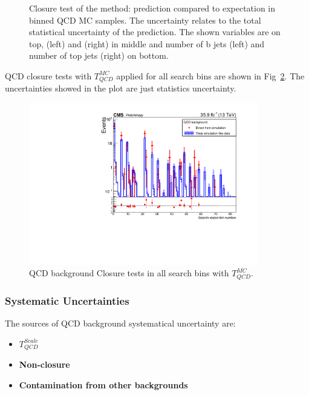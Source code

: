 \begin{figure}[hp]
\begin{center}
\begin{tabular}{cc}
\end{tabular}
\end{center}
\caption{Closure test of the method: prediction compared to expectation in \HT
binned QCD MC samples. The uncertainty relates to the total statistical uncertainty of the prediction. 
The shown variables are \MET on top, \MTTwo (left) and \HT (right) in middle 
and number of b jets (left) and number of top jets (right) on bottom.}
\label{fig:ClorureTestQCD}
\end{figure}

QCD closure tests with $T_{QCD}^{MC}$ applied for all search bins are shown in
Fig~\ref{fig:SBClosure}. The uncertainties showed in the plot are just statistics uncertainty.
\begin{figure}[htbp]
\begin{center}
\includegraphics[width=0.89\textwidth]{sections/mc4/Backgrounds/QCD/figures/84sb/_sb.pdf}
\end{center}\caption{QCD background Closure tests in all search bins with $T_{QCD}^{MC}$.}
\label{fig:SBClosure}
\end{figure}

\subsubsection{Systematic Uncertainties}

The sources of QCD background systematical uncertainty are:

\begin{itemize}
\item \textbf{$T_{QCD}^{Scale}$}
\item \textbf{Non-closure}
\item \textbf{Contamination from other backgrounds}
\end{itemize}

